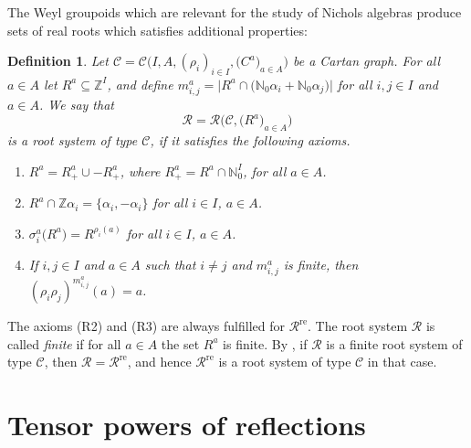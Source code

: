 \documentclass[pdftex]{sigma}
\numberwithin{equation}{section}
\newtheorem{Definition}[Theorem]{Definition}
\newcommand{\NN }{\mathbb{N}}
\newcommand{\ZZ }{\mathbb{Z}}
\newcommand{\Cc }{\mathcal{C}}
\newcommand{\rsC }{\mathcal{R}}
\newcommand{\re }{^\mathrm{re}}
\begin{document}
The Weyl groupoids which are relevant for the study of Nichols algebras produce sets of real roots which satisfies additional properties:

\begin{Definition}
Let $\Cc =\Cc \big(I,A,(\rho_i)_{i\in I},\big(C ^a\big)_{a\in A}\big)$ be a Cartan graph.
For all $a\in A$ let $R^a\subseteq \ZZ ^I$, and define
$m_{i,j}^a= \big|R^a \cap \big(\NN_0 \alpha_i + \NN_0 \alpha_j\big)\big|$ for all $i,j\in
I$ and $a\in A$. We say that
\[ \rsC = \rsC \big(\Cc , \big(R^a\big)_{a\in A}\big) \]
is a {\it root system of type} $\Cc $, if it satisfies the following axioms.
\begin{enumerate}\itemsep=0pt
\item[(R1)]
$R^a=R^a_+\cup - R^a_+$, where $R^a_+=R^a\cap \NN_0^I$, for all $a\in A$.
\item[(R2)]
$R^a\cap \ZZ\alpha_i=\{\alpha_i,-\alpha_i\}$ for all $i\in I$, $a\in A$.
\item[(R3)]
$\sigma _i^a\big(R^a\big) = R^{\rho_i(a)}$ for all $i\in I$, $a\in A$.
\item[(R4)]
If $i,j\in I$ and $a\in A$ such that $i\not=j$ and $m_{i,j}^a$ is finite, then
$(\rho_i\rho_j)^{m_{i,j}^a}(a)=a$.
\end{enumerate}
\end{Definition}

The axioms (R2) and (R3) are always fulfilled for $\rsC \re $.
The root system $\rsC $ is called {\it finite} if for all $a\in A$ the set $R^a$ is finite.
By \cite[Proposition~2.12]{p-CH09a}, if $\rsC $ is a finite root system
of type $\Cc $, then $\rsC =\rsC \re $, and hence $\rsC \re $ is a root
system of type $\Cc $ in that case.

\section{Tensor powers of reflections}\label{sec: tensor powers}
\end{document}
